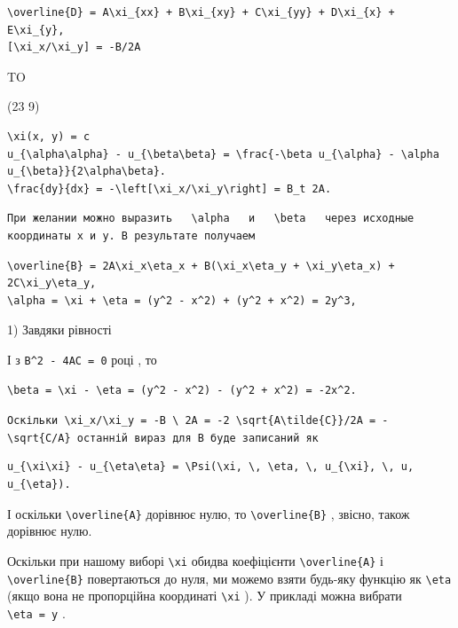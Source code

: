 \documentclass[
  ukrainian,
]{article}
\begin{document}
\begin{verbatim}
\overline{D} = A\xi_{xx} + B\xi_{xy} + C\xi_{yy} + D\xi_{x} + E\xi_{y},
[\xi_x/\xi_y] = -B/2A
\end{verbatim}

TO

(23 9)

\begin{verbatim}
\xi(x, y) = c
u_{\alpha\alpha} - u_{\beta\beta} = \frac{-\beta u_{\alpha} - \alpha u_{\beta}}{2\alpha\beta}.
\frac{dy}{dx} = -\left[\xi_x/\xi_y\right] = B_t 2A.
\end{verbatim}

\begin{verbatim}
При желании можно выразить   \alpha   и   \beta   через исходные координаты x и y. В результате получаем
\end{verbatim}

\begin{verbatim}
\overline{B} = 2A\xi_x\eta_x + B(\xi_x\eta_y + \xi_y\eta_x) + 2C\xi_y\eta_y,
\alpha = \xi + \eta = (y^2 - x^2) + (y^2 + x^2) = 2y^3,
\end{verbatim}

1) Завдяки рівності

І з \texttt{B\^{}2\ -\ 4AC\ =\ 0} році , то

\begin{verbatim}
\beta = \xi - \eta = (y^2 - x^2) - (y^2 + x^2) = -2x^2.
\end{verbatim}

\texttt{Оскільки\ \textquotesingle{}\textbackslash{}xi\_x/\textbackslash{}xi\_y\ =\ -B\ \textbackslash{}\ 2A\ =\ -2\ \textbackslash{}sqrt\{A\textbackslash{}tilde\{C\}\}/2A\ =\ -\textbackslash{}sqrt\{C/A\}\textquotesingle{}\ останній\ вираз\ для\ B\ буде\ записаний\ як}

\begin{verbatim}
u_{\xi\xi} - u_{\eta\eta} = \Psi(\xi, \, \eta, \, u_{\xi}, \, u, u_{\eta}).
\end{verbatim}

І оскільки \texttt{\textbackslash{}overline\{A\}} дорівнює нулю, то
\texttt{\textbackslash{}overline\{B\}} , звісно, також дорівнює нулю.

Оскільки при нашому виборі \texttt{\textbackslash{}xi} обидва
коефіцієнти \texttt{\textbackslash{}overline\{A\}} і
\texttt{\textbackslash{}overline\{B\}} повертаються до нуля, ми можемо
взяти будь-яку функцію як \texttt{\textbackslash{}eta} (якщо вона не
пропорційна координаті \texttt{\textbackslash{}xi} ). У прикладі можна
вибрати \texttt{\textbackslash{}eta\ =\ y} .
\end{document}
